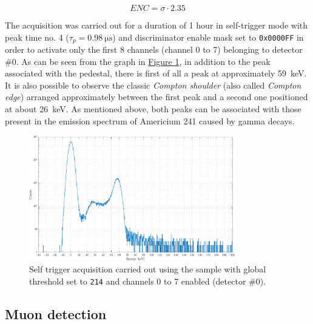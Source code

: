 \vspace{0.15cm}

\begin{equation}
    ENC = \sigma \cdot 2.35
    \label{ENCchargeScan}
\end{equation}

\par
The acquisition was carried out for a duration of 1 hour in self-trigger mode with peak time no. 4 ($\tau_{p} = \SI{0.98}{\micro\second}$) and discriminator enable mask set to \texttt{0x0000FF} in order to activate only the first 8 channels (channel 0 to 7) belonging to detector \#0. As can be seen from the graph in \hyperref[figAmericioTHR214]{Figure \ref{figAmericioTHR214}}, in addition to the peak associated with the pedestal, there is first of all a peak at approximately \SI{59}{\kilo\electronvolt}. It is also possible to observe the classic \textit{Compton shoulder} (also called \textit{Compton edge}) arranged approximately between the first peak and a second one positioned at about \SI{26}{\kilo\electronvolt}. As mentioned above, both peaks can be associated with those present in the emission spectrum of Americium 241 caused by gamma decays.

\begin{figure}[h!]
    \centering
    \includegraphics[width=0.8\textwidth]{Images/chap3/results/americio/ch4_americio_log.pdf}
    \caption{Self trigger acquisition carried out using the  sample with global threshold set to \texttt{214} and channels 0 to 7 enabled (detector \#0).}
    \label{figAmericioTHR214}
\end{figure}

\subsection{Muon detection}
\label{secMuonDetectionResults}

